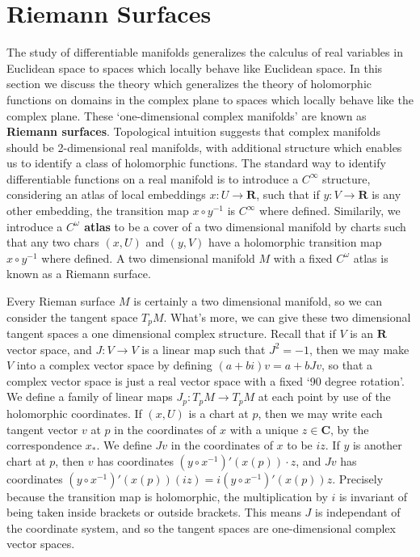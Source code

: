 \section{Riemann Surfaces}

The study of differentiable manifolds generalizes the calculus of real variables in Euclidean space to spaces which locally behave like Euclidean space. In this section we discuss the theory which generalizes the theory of holomorphic functions on domains in the complex plane to spaces which locally behave like the complex plane. These `one-dimensional complex manifolds' are known as {\bf Riemann surfaces}. Topological intuition suggests that complex manifolds should be 2-dimensional real manifolds, with additional structure which enables us to identify a class of holomorphic functions. The standard way to identify differentiable functions on a real manifold is to introduce a $C^\infty$ structure, considering an atlas of local embeddings $x: U \to \mathbf{R}$, such that if $y: V \to \mathbf{R}$ is any other embedding, the transition map $x \circ y^{-1}$ is $C^\infty$ where defined. Similarily, we introduce a {\bf $C^\omega$ atlas} to be a cover of a two dimensional manifold by charts such that any two chars $(x,U)$ and $(y,V)$ have a holomorphic transition map $x \circ y^{-1}$ where defined. A two dimensional manifold $M$ with a fixed $C^\omega$ atlas is known as a Riemann surface.

Every Rieman surface $M$ is certainly a two dimensional manifold, so we can consider the tangent space $T_p M$. What's more, we can give these two dimensional tangent spaces a one dimensional complex structure. Recall that if $V$ is an $\mathbf{R}$ vector space, and $J: V \to V$ is a linear map such that $J^2 = -1$, then we may make $V$ into a complex vector space by defining $(a + bi)v = a + bJv$, so that a complex vector space is just a real vector space with a fixed `90 degree rotation'. We define a family of linear maps $J_p: T_p M \to T_p M$ at each point by use of the holomorphic coordinates. If $(x,U)$ is a chart at $p$, then we may write each tangent vector $v$ at $p$ in the coordinates of $x$ with a unique $z \in \mathbf{C}$, by the correspondence $x_*$. We define $Jv$ in the coordinates of $x$ to be $iz$. If $y$ is another chart at $p$, then $v$ has coordinates $(y \circ x^{-1})'(x(p)) \cdot z$, and $Jv$ has coordinates $(y \circ x^{-1})'(x(p))(iz) = i(y \circ x^{-1})'(x(p)) z$. Precisely because the transition map is holomorphic, the multiplication by $i$ is invariant of being taken inside brackets or outside brackets. This means $J$ is independant of the coordinate system, and so the tangent spaces are one-dimensional complex vector spaces.

